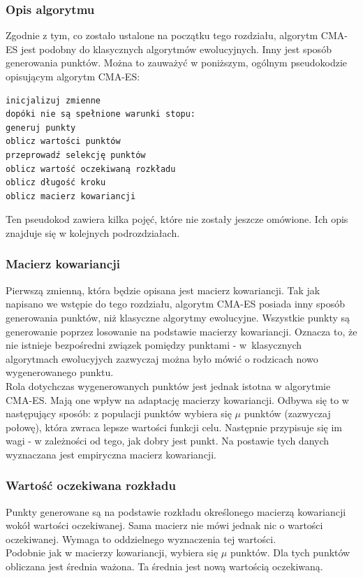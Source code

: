 \documentclass{mini}
\begin{document}
\subsubsection{Opis algorytmu}
Zgodnie z tym, co zostało ustalone na początku tego rozdziału, algorytm CMA-ES jest podobny do klasycznych algorytmów ewolucyjnych. Inny jest sposób generowania punktów. Można to zauważyć w poniższym, ogólnym pseudokodzie opisującym algorytm CMA-ES:
\begin{Verbatim}[baselinestretch=1.1]
inicjalizuj zmienne
dopóki nie są spełnione warunki stopu:
generuj punkty
oblicz wartości punktów
przeprowadź selekcję punktów
oblicz wartość oczekiwaną rozkładu
oblicz długość kroku
oblicz macierz kowariancji
\end{Verbatim}
Ten pseudokod zawiera kilka pojęć, które nie zostały jeszcze omówione. Ich opis znajduje się w kolejnych podrozdziałach.

\subsubsection*{Macierz kowariancji}
Pierwszą zmienną, która będzie opisana jest macierz kowariancji. Tak jak napisano we wstępie do tego rozdziału, algorytm CMA-ES posiada inny sposób generowania punktów, niż klasyczne algorytmy ewolucyjne. Wszystkie punkty są generowanie poprzez losowanie na podstawie macierzy kowariancji. Oznacza to, że nie istnieje bezpośredni związek pomiędzy punktami - w~klasycznych algorytmach ewolucyjych zazwyczaj można było mówić o rodzicach nowo wygenerowanego punktu.\\
Rola dotychczas wygenerowanych punktów jest jednak istotna w algorytmie CMA-ES. Mają one wpływ na adaptację macierzy kowariancji. Odbywa się to w następujący sposób: z populacji punktów wybiera się $\mu$ punktów (zazwyczaj połowę), która zwraca lepsze wartości funkcji celu. Następnie przypisuje się im wagi - w zależności od tego, jak dobry jest punkt. Na postawie tych danych wyznaczana jest empiryczna macierz kowariancji.

\subsubsection*{Wartość oczekiwana rozkładu}
Punkty generowane są na podstawie rozkładu określonego macierzą kowariancji wokół wartości oczekiwanej. Sama macierz nie mówi jednak nic o wartości oczekiwanej. Wymaga to oddzielnego wyznaczenia tej wartości.\\
Podobnie jak w macierzy kowariancji, wybiera się $\mu$ punktów. Dla tych punktów obliczana jest średnia ważona. Ta średnia jest nową wartością oczekiwaną.
\end{document}
